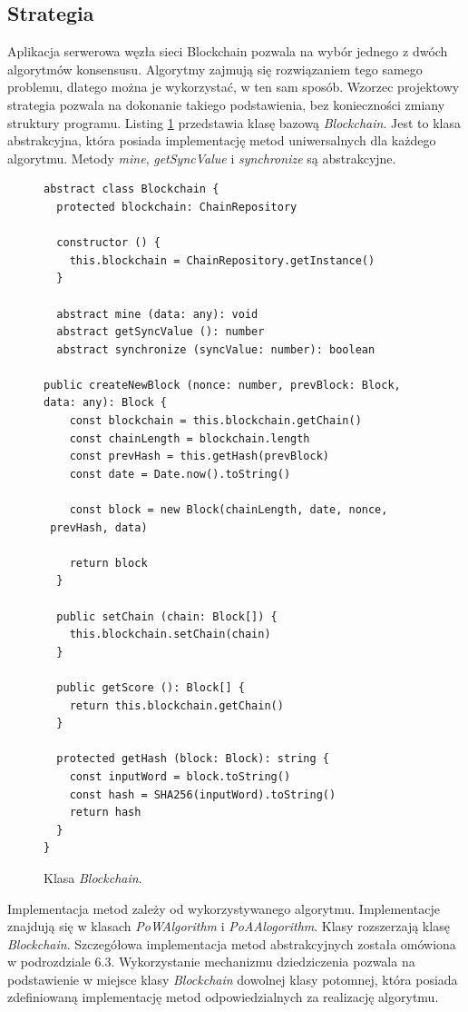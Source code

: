\documentclass[a4paper,12pt]{book}
\begin{document}
\subsection{Strategia}

Aplikacja serwerowa węzła sieci Blockchain pozwala na wybór jednego z dwóch algorytmów konsensusu. Algorytmy zajmują się rozwiązaniem tego samego problemu, dlatego można je wykorzystać, w ten sam sposób. Wzorzec projektowy strategia pozwala na dokonanie takiego podstawienia, bez konieczności zmiany struktury programu. Listing \ref{abstractBlockchain} przedstawia klasę bazową \textit{Blockchain}.
Jest to klasa abstrakcyjna, która posiada implementację metod uniwersalnych dla każdego algorytmu. Metody \textit{mine}, \textit{getSyncValue} i \textit{synchronize} są abstrakcyjne.
 
\begin{figure}[H]
  \centering
\begin{lstlisting}[style=ES6]
abstract class Blockchain {
  protected blockchain: ChainRepository

  constructor () {
    this.blockchain = ChainRepository.getInstance()
  }

  abstract mine (data: any): void
  abstract getSyncValue (): number
  abstract synchronize (syncValue: number): boolean

public createNewBlock (nonce: number, prevBlock: Block, 
data: any): Block {
    const blockchain = this.blockchain.getChain()
    const chainLength = blockchain.length
    const prevHash = this.getHash(prevBlock)
    const date = Date.now().toString()

    const block = new Block(chainLength, date, nonce,
 prevHash, data)

    return block
  }

  public setChain (chain: Block[]) {
    this.blockchain.setChain(chain)
  }

  public getScore (): Block[] {
    return this.blockchain.getChain()
  }

  protected getHash (block: Block): string {
    const inputWord = block.toString()
    const hash = SHA256(inputWord).toString()
    return hash
  }
}
\end{lstlisting}
\caption{Klasa \textit{Blockchain}.}
\label{abstractBlockchain}
\end{figure}
Implementacja metod zależy od wykorzystywanego algorytmu. Implementacje znajdują się w klasach \textit{PoWAlgorithm} i \textit{PoAAlogorithm}. Klasy rozszerzają klasę \textit{Blockchain}.
Szczegółowa implementacja metod abstrakcyjnych została omówiona w podrozdziale 6.3. Wykorzystanie mechanizmu dziedziczenia pozwala na podstawienie w miejsce klasy \textit{Blockchain} dowolnej klasy potomnej, która posiada zdefiniowaną implementację metod odpowiedzialnych za realizację algorytmu.
 
\end{document}
